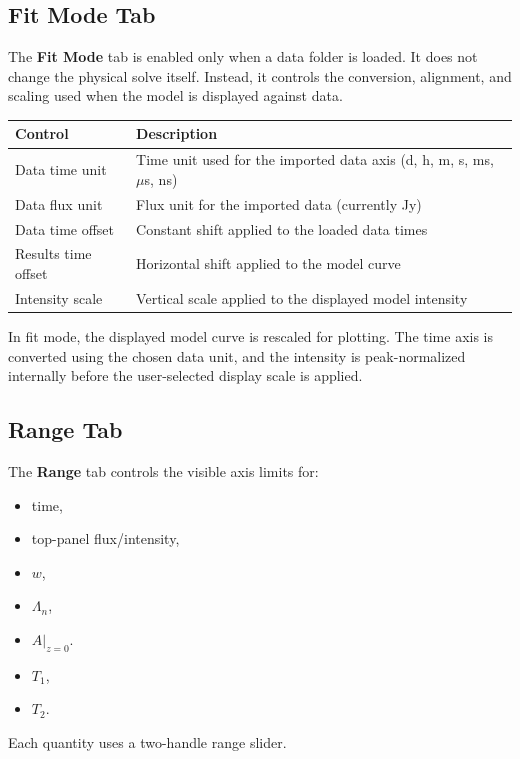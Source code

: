 \documentclass[12pt,a4paper]{article}
\newcommand{\tab}[1]{\textbf{#1}}
\begin{document}
\subsection{Fit Mode Tab}
\label{sec:fitmodetab}

The \tab{Fit Mode} tab is enabled only when a data folder is loaded. It does not change the physical solve
itself. Instead, it controls the conversion, alignment, and scaling used when the model is displayed against data.

\begin{center}
\begin{tabular}{@{}ll@{}}
  \toprule
  Control & Description \\
  \midrule
  Data time unit & Time unit used for the imported data axis (d, h, m, s, ms, $\mu$s, ns) \\
  Data flux unit & Flux unit for the imported data (currently Jy) \\
  Data time offset & Constant shift applied to the loaded data times \\
  Results time offset & Horizontal shift applied to the model curve \\
  Intensity scale & Vertical scale applied to the displayed model intensity \\
  \bottomrule
\end{tabular}
\end{center}

\begin{notebox}
In fit mode, the displayed model curve is rescaled for plotting. The time axis is converted using the chosen data
unit, and the intensity is peak-normalized internally before the user-selected display scale is applied.
\end{notebox}

\subsection{Range Tab}

The \tab{Range} tab controls the visible axis limits for:
\begin{itemize}[noitemsep]
  \item time,
  \item top-panel flux/intensity,
  \item $w$,
  \item $\Lambda_n$,
  \item $A\vert_{z=0}$.
  \item $T_1$,
  \item $T_2$.
\end{itemize}
Each quantity uses a two-handle range slider.
\end{document}
